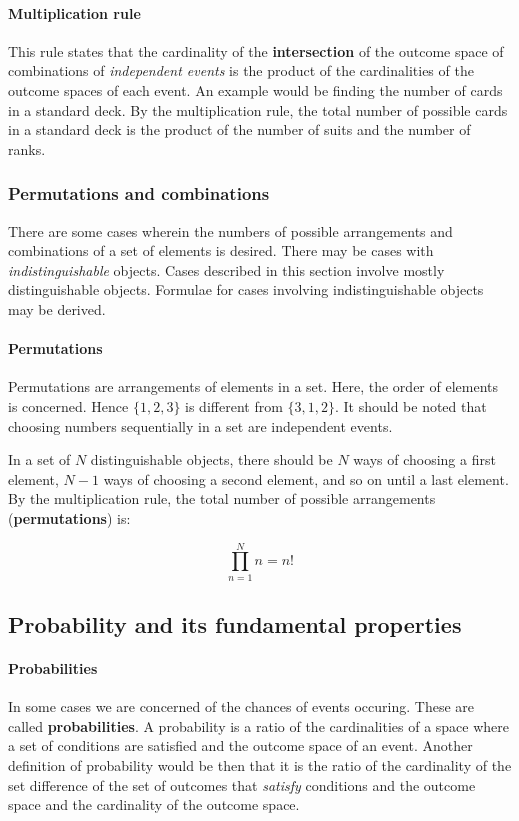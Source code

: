 \paragraph{Multiplication rule}
This rule states that the cardinality of the \textbf{intersection} of the outcome space of combinations of \emph{independent events} is the product of the cardinalities of the outcome spaces of each event.
An example would be finding the number of cards in a standard deck.
By the multiplication rule, the total number of possible cards in a standard deck is the product of the number of suits and the number of ranks.

\subsubsection{Permutations and combinations}
There are some cases wherein the numbers of possible arrangements and combinations of a set of elements is desired.
There may be cases with \textit{indistinguishable} objects.
Cases described in this section involve mostly distinguishable objects.
Formulae for cases involving indistinguishable objects may be derived.

\paragraph{Permutations}
Permutations are arrangements of elements in a set.
Here, the order of elements is concerned.
Hence $\{1, 2, 3\}$ is different from $\{3, 1, 2\}$.
It should be noted that choosing numbers sequentially in a set are independent events.

In a set of $N$ distinguishable objects, there should be $N$ ways of choosing a first element, $N-1$ ways of choosing a second element, and so on until a last element.
By the multiplication rule, the total number of possible arrangements (\textbf{permutations}) is:

$$\prod\limits_{n=1}^{N}n = n!$$

\subsection{Probability and its fundamental properties}

\paragraph{Probabilities}
In some cases we are concerned of the chances of events occuring.
These are called \textbf{probabilities}.
A probability is a ratio of the cardinalities of a space where a set of conditions are satisfied and the outcome space of an event.
Another definition of probability would be then that it is the ratio of the cardinality of the set difference of the set of outcomes that \emph{satisfy} conditions and the outcome space and the cardinality of the outcome space.

